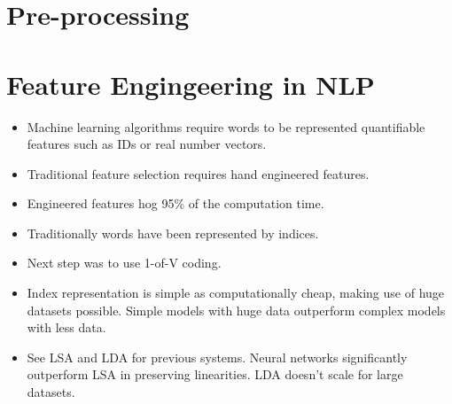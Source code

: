 \documentclass[12pt,a4paper,english
]{tutthesis}
\begin{document}
\section{Pre-processing}
\label{ch:pre-processing}

\section{Feature Engingeering in NLP}
\label{ch:feature_engineering_in_nlp}
\begin{itemize}
\item Machine learning algorithms require words to be represented quantifiable features such as IDs or real number vectors.
\item Traditional feature selection requires hand engineered features.
\item Engineered features hog 95\% of the computation time. \cite{Chen2014}
\item Traditionally words have been represented by indices. \cite{Mikolov2013}
\item Next step was to use 1-of-V coding.
\item Index representation is simple as computationally cheap, making use of huge datasets possible. Simple models with huge data outperform complex models with less data. \cite{Mikolov2013}
\item See LSA and LDA for previous systems. Neural networks significantly outperform LSA in preserving linearities. LDA doesn't scale for large datasets. \cite{Mikolov2013}
\end{itemize}
\end{document}
